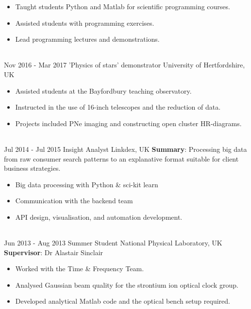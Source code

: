 \documentclass[letterpaper]{twentysecondcv} %
\begin{document}
\begin{twenty}
{\begin{itemize}
                \item Taught students Python and Matlab for scientific programming courses.
                \item Assisted students with programming exercises.
                \item Lead programming lectures and demonstrations.
            \end{itemize}
        }
        \\
    \twentyitem
        {Nov 2016 -}
        {Mar 2017}
        {'Physics of stars' demonstrator}
        {University of Hertfordshire, UK}
        {}
        {
            \begin{itemize}
                \item Assisted students at the Bayfordbury teaching observatory. 
                \item Instructed in the use of 16-inch telescopes and the reduction of data.
                \item Projects included PNe imaging and constructing open cluster HR-diagrams.
            \end{itemize}
        }
        \\
    \twentyitem
    	{Jul 2014 -}
		{Jul 2015}
        {Insight Analyst}
        {Linkdex, UK}
        {\textbf{Summary}: Processing big data from raw consumer search patterns to an explanative format suitable for client business strategies.}
        {
        \begin{itemize}
            \item Big data processing with Python \& sci-kit learn
            \item Communication with the backend team 
            \item API design, visualisation, and automation development.
        \end{itemize}
        }
    \\
	\twentyitem
    	{Jun 2013 -}
		{Aug 2013}
        {Summer Student}
        {National Physical Laboratory, UK}
        {\textbf{Supervisor}: Dr Alastair Sinclair}
        {
        \begin{itemize}
            \item Worked with the Time \& Frequency Team.
            \item Analysed Gaussian beam quality for the strontium ion optical clock group.
            \item Developed analytical Matlab code and the optical bench setup required.
        \end{itemize}
        }
    \\
\end{twenty}
\end{document}
